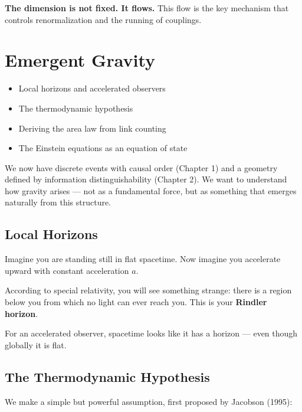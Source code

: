 \documentclass[11pt, a4paper, openany]{book}
\newenvironment{introduction}[1][Chapter Overview]{%
  \begin{tcolorbox}[
    enhanced,
    colback=structurecolor!5,
    colframe=structurecolor,
    colbacktitle=structurecolor,
    coltitle=white,
    fonttitle=\bfseries,
    title={#1},
    arc=3pt, boxrule=1pt,
    left=10pt, right=10pt, top=8pt, bottom=8pt,
    before skip=15pt, after skip=15pt
  ]
  \begin{itemize}[leftmargin=*, itemsep=3pt]
}{%
  \end{itemize}
  \end{tcolorbox}
}
\begin{document}
\begin{result}
\textbf{The dimension is not fixed. It flows.}
This flow is the key mechanism that controls renormalization and the running of couplings.
\end{result}


\chapter{Emergent Gravity}

\begin{introduction}
  \item Local horizons and accelerated observers
  \item The thermodynamic hypothesis
  \item Deriving the area law from link counting
  \item The Einstein equations as an equation of state
\end{introduction}

We now have discrete events with causal order (Chapter 1) and a geometry defined by information distinguishability (Chapter 2).
We want to understand how gravity arises --- not as a fundamental force, but as something that emerges naturally from this structure.

\section{Local Horizons}

Imagine you are standing still in flat spacetime.
Now imagine you accelerate upward with constant acceleration $a$.

According to special relativity, you will see something strange: there is a region below you from which no light can ever reach you.
This is your \textbf{Rindler horizon}.

For an accelerated observer, spacetime looks like it has a horizon --- even though globally it is flat.

\section{The Thermodynamic Hypothesis}

We make a simple but powerful assumption, first proposed by Jacobson (1995):
\end{document}
